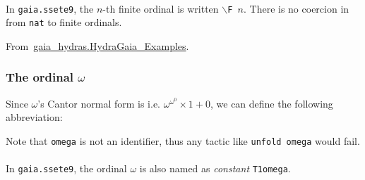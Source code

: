 \label{sect:notation-F}



\paragraph*{\gaiasign}
  In \texttt{gaia.ssete9}, the $n$-th finite ordinal is written
  \texttt{$\backslash${F}\,$n$}. There is no coercion in \gaia from \texttt{nat} to finite ordinals.

  \vspace{4pt}
  
  From~\href{../theories/html/gaia_hydras.HydraGaia_Examples.html}{gaia\_hydras.HydraGaia\_Examples}.

  




\subsubsection{The ordinal \(\omega\)}
\label{sec:orgheadline68}

  Since \(\omega\)'s Cantor normal form is
i.e. \(\omega^{\omega^0}\times 1+ 0\), we can define the following abbreviation:

\label{sect:omega-notation2}



Note that \texttt{omega} is not an identifier, thus any tactic like \texttt{unfold omega} would fail.

\paragraph*{\gaiasign}
In \texttt{gaia.ssete9}, the ordinal $\omega$ is also named as \emph{constant}  \texttt{T1omega}.



